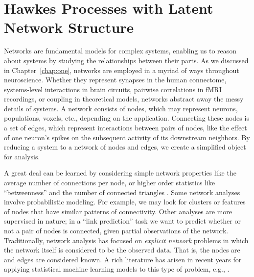 
\chapter{Hawkes Processes with Latent Network Structure}
\label{chap:three}

Networks are fundamental models for complex systems, enabling us to
reason about systems by studying the relationships between their
parts.
As we discussed in Chapter~\ref{chap:one}, networks are employed in a myriad of ways throughout
neuroscience.  Whether they represent synapses in the human
connectome, systems-level interactions in brain circuits, pairwise
correlations in fMRI recordings, or coupling in theoretical models,
networks abstract away the messy details of systems.  A network consists of nodes, which
may represent neurons, populations, voxels, etc., depending on the application.
Connecting these nodes is a set of edges, 
which represent interactions between  pairs of nodes, like the effect
of one neuron's spikes on the subsequent activity of its downstream
neighbors.  By reducing a system to a network of nodes and edges,
we create a simplified object for analysis.

A great deal can be learned by considering simple network properties
like the average number of connections per node, or higher order
statistics like ``betweenness'' and the number of connected triangles
\citep{bullmore2009complex}.  Some network analyses involve
probabilistic modeling.  For example, we may look for clusters or
features of nodes that have similar patterns of connectivity.  Other
analyses are more supervised in nature; in a ``link prediction'' task
we want to predict whether or not a pair of nodes is connected, given
partial observations of the network.
 Traditionally, network analysis has focused on \emph{explicit
   network} problems in which the network itself is considered to be
 the observed data.  That is, the nodes are and edges are considered
 known. A rich literature has arisen in recent years for applying
 statistical machine learning models to this type of problem, e.g.,
 \citet{Liben-2007,Hoff-2008,Goldenberg-2010}.

